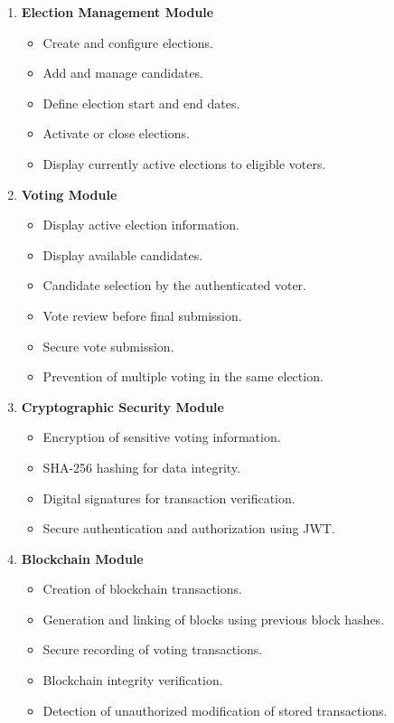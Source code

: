 \documentclass[12pt,a4paper]{report}
\begin{document}
\begin{enumerate}[leftmargin=*, itemsep=4pt]
	\item \textbf{Election Management Module}
	\begin{itemize}
		\item Create and configure elections.
		\item Add and manage candidates.
		\item Define election start and end dates.
		\item Activate or close elections.
		\item Display currently active elections to eligible voters.
	\end{itemize}
	
	\item \textbf{Voting Module}
	\begin{itemize}
		\item Display active election information.
		\item Display available candidates.
		\item Candidate selection by the authenticated voter.
		\item Vote review before final submission.
		\item Secure vote submission.
		\item Prevention of multiple voting in the same election.
	\end{itemize}
	
	\item \textbf{Cryptographic Security Module}
	\begin{itemize}
		\item Encryption of sensitive voting information.
		\item SHA-256 hashing for data integrity.
		\item Digital signatures for transaction verification.
		\item Secure authentication and authorization using JWT.
	\end{itemize}
	
	\item \textbf{Blockchain Module}
	\begin{itemize}
		\item Creation of blockchain transactions.
		\item Generation and linking of blocks using previous block hashes.
		\item Secure recording of voting transactions.
		\item Blockchain integrity verification.
		\item Detection of unauthorized modification of stored transactions.
	\end{itemize}
	

\end{enumerate}
\end{document}
